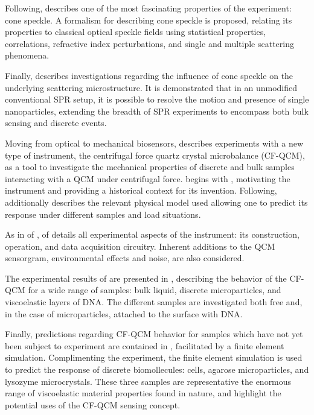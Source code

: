Following,  describes one of the most fascinating
properties of the experiment: cone speckle.  A formalism for describing
cone speckle is proposed, relating its properties to classical optical
speckle fields using statistical properties, correlations, refractive index
perturbations, and single and multiple scattering phenomena.

Finally,  describes investigations regarding
the influence of cone speckle on the underlying scattering microstructure.
It is demonstrated that in an unmodified conventional SPR setup, it is
possible to resolve the motion and presence of single nanoparticles,
extending the breadth of SPR experiments to encompass both bulk sensing and
discrete events.  

Moving from optical to mechanical biosensors,  describes
experiments with a new type of instrument, the centrifugal force quartz
crystal microbalance (CF-QCM), as a tool to investigate the mechanical
properties of discrete and bulk samples interacting with a QCM under
centrifugal force.   begins with
, motivating the instrument and providing a
historical context for its invention.  Following,
 additionally describes the relevant physical
model used allowing one to predict its response under different samples and
load situations.

As in  of ,
 of  details all experimental
aspects of the instrument: its construction, operation, and data
acquisition circuitry.  Inherent additions to the QCM sensorgram, 
environmental effects and noise, are also considered.

The experimental results of  are presented in
, describing the behavior of the CF-QCM for a
wide range of samples: bulk liquid, discrete microparticles, and
viscoelastic layers of DNA\@.  The different samples are investigated both
free and, in the case of microparticles, attached to the surface with
DNA\@.

Finally, predictions regarding CF-QCM behavior for samples which have not
yet been subject to experiment are contained in ,
facilitated by a finite element simulation.  Complimenting the experiment,
the finite element simulation is used to predict the response of discrete
biomollecules: cells, agarose microparticles, and lysozyme microcrystals.
These three samples are representative the enormous range of viscoelastic
material properties found in nature, and highlight the potential uses of
the CF-QCM sensing concept.
